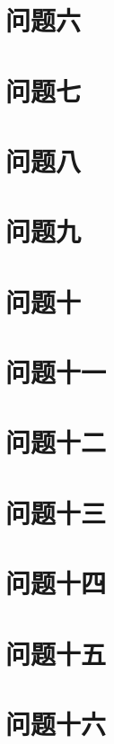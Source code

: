 \documentclass[fontset=windowsnew,zihao=-4,scheme=chinese,punct=quanjiao,linespread=1,UTF8]{ctexart}
\begin{document}
\section{问题六}

\section{问题七}

\section{问题八}

\section{问题九}

\section{问题十}

\section{问题十一}

\section{问题十二}

\section{问题十三}

\section{问题十四}

\section{问题十五}

\section{问题十六}

\end{document}
